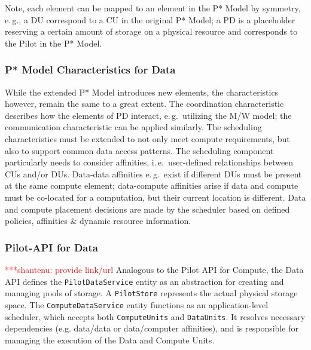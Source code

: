 \documentclass[conference,final]{IEEEtran}
\makeatletter
\def\reduwave{\bgroup \markoverwith{\lower3.5\p@\hbox{\sixly \textcolor{red}{\char58}}}\ULon}
\newcommand{\jwave}[1]{ {\reduwave{#1}}}
\newcommand{\jhanote}[1]{ {\textcolor{red} { ***shantenu: #1 }}}
\newcommand{\alnote}[1]{ {\textcolor{blue} { ***andrel: #1 }}}
\newcommand{\jwave}[1]{#1}
\newcommand{\alnote}[1]{}
\newcommand{\jhanote}[1]{}
\newcommand{\pilot}{Pilot\xspace}
\newcommand{\cu}{CU\xspace}
\newcommand{\cus}{CUs\xspace}
\newcommand{\dus}{DUs\xspace}
\makeatother
\begin{document}
Note, each element can be mapped to an element in the P* Model by
symmetry, e.\,g., a DU correspond to a \cu  in the original P* Model; 
a PD is a placeholder reserving a certain amount of storage on a physical 
resource and corresponds to the \pilot in the P* Model.



\subsubsection*{P* Model Characteristics for Data}

While the extended P* Model introduces new elements, the
characteristics however, remain the same to a great extent. The
coordination characteristic describes how the elements of PD interact,
e.\,g.\ utilizing the M/W model; the communication characteristic can
be applied similarly. The scheduling characteristics must be extended
to not only meet compute requirements, but also to support common data
access patterns. The scheduling component particularly needs to
consider affinities, i.\,e.\ user-defined relationships between \cus
and/or \dus. Data-data affinities e.\,g.\ exist if different \dus must
be present at the same compute element; data-compute affinities arise
if data and compute must be co-located for a computation, but their
current location is different. Data and compute placement decisions are
made by the scheduler based on defined policies, affinities \& dynamic
resource information.


\subsubsection*{Pilot-API for Data} \jhanote{provide link/url}
Analogous to the Pilot API for Compute, the Data API defines the
\texttt{PilotDataService} entity as an abstraction for creating and
managing pools of storage. A \texttt{PilotStore} represents the actual
physical storage space. The \texttt{ComputeDataService} entity
functions as an application-level scheduler, which accepts both
\texttt{ComputeUnits} and \texttt{DataUnits}. It resolves necessary
dependencies (e.g. data/data or data/computer affinities), and is
responsible for managing the execution of the Data and Compute Units.
\end{document}

